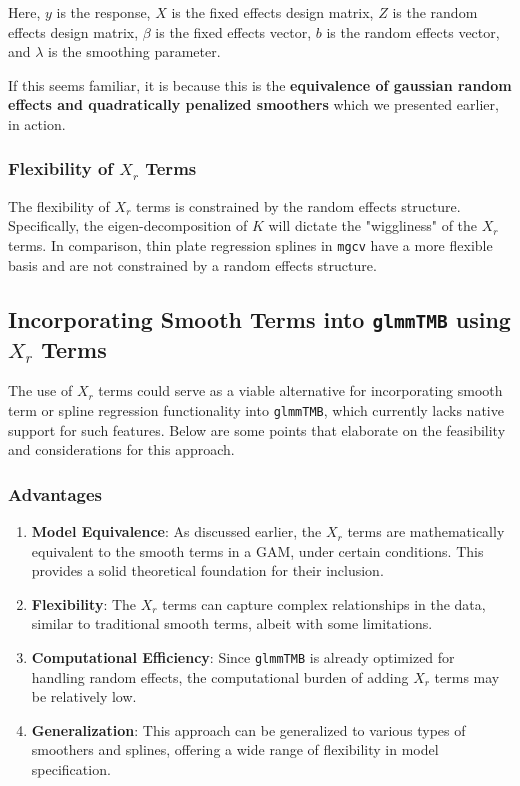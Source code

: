 Here, \(y\) is the response, \(X\) is the fixed effects design matrix, \(Z\) is the random effects design matrix, \(\beta\) is the fixed effects vector, \(b\) is the random effects vector, and \(\lambda\) is the smoothing parameter.
\newline

If this seems familiar, it is because this is the \textbf{equivalence of gaussian random effects and quadratically penalized smoothers} which we presented earlier, in action.

\subsubsection{Flexibility of \(X_r\) Terms}

The flexibility of \(X_r\) terms is constrained by the random effects structure. Specifically, the eigen-decomposition of \(K\) will dictate the "wiggliness" of the \(X_r\) terms. In comparison, thin plate regression splines in \texttt{mgcv} have a more flexible basis and are not constrained by a random effects structure.

\subsection{Incorporating Smooth Terms into \texttt{glmmTMB} using \(X_r\) Terms}

The use of \(X_r\) terms could serve as a viable alternative for incorporating smooth term or spline regression functionality into \texttt{glmmTMB}, which currently lacks native support for such features. Below are some points that elaborate on the feasibility and considerations for this approach.

\subsubsection{Advantages}

\begin{enumerate}
    \item \textbf{Model Equivalence}: As discussed earlier, the \(X_r\) terms are mathematically equivalent to the smooth terms in a GAM, under certain conditions. This provides a solid theoretical foundation for their inclusion.
    
    \item \textbf{Flexibility}: The \(X_r\) terms can capture complex relationships in the data, similar to traditional smooth terms, albeit with some limitations.
    
    \item \textbf{Computational Efficiency}: Since \texttt{glmmTMB} is already optimized for handling random effects, the computational burden of adding \(X_r\) terms may be relatively low.
    
    \item \textbf{Generalization}: This approach can be generalized to various types of smoothers and splines, offering a wide range of flexibility in model specification.
\end{enumerate}

